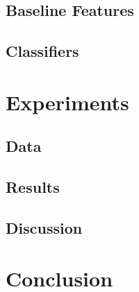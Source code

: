 \documentclass[runningheads]{llncs}
\begin{document}
\subsection{Baseline Features}
\subsection{Classifiers}
\section{Experiments}
\subsection{Data}
\subsection{Results}
\subsection{Discussion}
\section{Conclusion}



\end{document}
